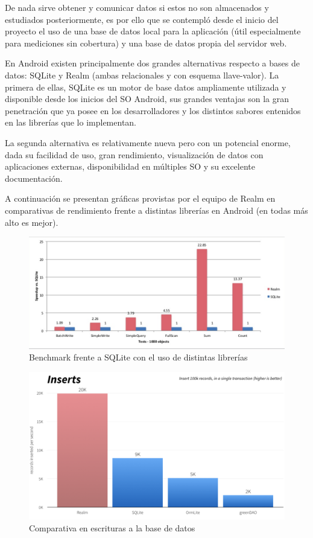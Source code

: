 De nada sirve obtener y comunicar datos si estos no son almacenados y estudiados posteriormente, es por ello que se contempló desde el inicio del proyecto el uso de una base de datos local para la aplicación (útil especialmente para mediciones sin cobertura) y una base de datos propia del servidor web.

En Android existen principalmente dos grandes alternativas respecto a bases de datos: SQLite y Realm (ambas relacionales y con esquema llave-valor). La primera de ellas, SQLite es un motor de base datos ampliamente utilizada y disponible desde los inicios del SO Android, sus grandes ventajas son la gran penetración que ya posee en los desarrolladores y los distintos sabores entenidos en las librerías que lo implementan.

La segunda alternativa es relativamente nueva pero con un potencial enorme, dada su facilidad de uso, gran rendimiento, visualización de datos con aplicaciones externas, disponibilidad en múltiples SO y su excelente documentación.

A continuación se presentan gráficas provistas por el equipo de Realm en comparativas de rendimiento \cite{realm_android} frente a distintas librerías en Android (en todas más alto es mejor).

 \begin{figure}[H]
 	\centering
 	\includegraphics[scale=0.3]{figuras/proto2/benchmark.png}
 	\caption{Benchmark frente a SQLite con el uso de distintas librerías}
 	\label{benchmark_realm}
 \end{figure}

\begin{figure}[H]
	\centering
	\includegraphics[scale=0.4]{figuras/proto2/insert.png}
	\caption{Comparativa en escrituras a la base de datos}
	\label{insert}
\end{figure}

